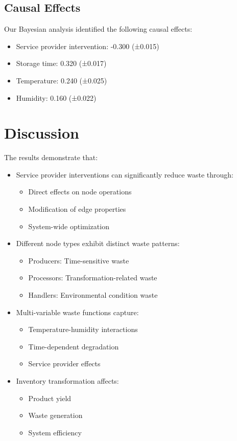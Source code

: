 \documentclass[12pt]{article}
\theoremstyle{definition}
\begin{document}
\subsection{Causal Effects}
Our Bayesian analysis identified the following causal effects:
\begin{itemize}
    \item Service provider intervention: -0.300 (±0.015)
    \item Storage time: 0.320 (±0.017)
    \item Temperature: 0.240 (±0.025)
    \item Humidity: 0.160 (±0.022)
\end{itemize}

\section{Discussion}
The results demonstrate that:
\begin{itemize}
    \item Service provider interventions can significantly reduce waste through:
        \begin{itemize}
            \item Direct effects on node operations
            \item Modification of edge properties
            \item System-wide optimization
        \end{itemize}
    \item Different node types exhibit distinct waste patterns:
        \begin{itemize}
            \item Producers: Time-sensitive waste
            \item Processors: Transformation-related waste
            \item Handlers: Environmental condition waste
        \end{itemize}
    \item Multi-variable waste functions capture:
        \begin{itemize}
            \item Temperature-humidity interactions
            \item Time-dependent degradation
            \item Service provider effects
        \end{itemize}
    \item Inventory transformation affects:
        \begin{itemize}
            \item Product yield
            \item Waste generation
            \item System efficiency
        \end{itemize}
\end{itemize}
\end{document}
